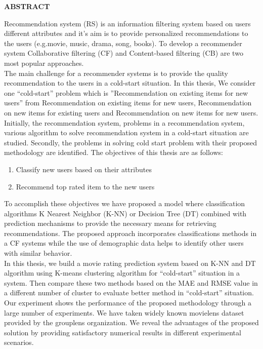 \documentclass[document.tex]{subfiles}
\begin{document}
\begin{center}
        \textbf{{\fontsize{16pt}{1.5cm}\selectfont ABSTRACT}}
        \vspace{1cm}
\end{center}

\noindent Recommendation system (RS) is an information filtering system based on users different attributes and it’s aim is to provide personalized recommendations to the users (e.g.movie, music, drama, song, books). To develop a recommender system Collaborative filtering (CF) and Content-based filtering (CB) are two most popular approaches.\\
The main challenge for a recommender systems is to provide the quality recommendation to the users in a cold-start situation. In this thesis, We consider one “cold-start” problem which is ”Recommendation on existing items for new users” from Recommendation on existing items for new users, Recommendation on new items for existing users and Recommendation on new items for new users. Initially, the recommendation system, problems in a recommendation system, various algorithm to solve recommendation system in a cold-start situation are studied. Secondly, the problems in solving cold start problem with their proposed methodology are identified.
The objectives of this thesis are as follows:
\begin{enumerate}
	\item Classify new users based on their attributes
	\item Recommend top rated item to the new users
\end{enumerate}	
To accomplish these objectives we have proposed a model where classification algorithms K Nearest Neighbor (K-NN) or Decision Tree (DT) combined with prediction mechanisms to provide the necessary means for retrieving recommendations. The proposed approach incorporates classifications methods in a CF systems while the use of demographic data helps to identify other users with similar behavior.\\
In this thesis, we build a movie rating prediction system based on K-NN and DT algorithm using K-means clustering algorithm for “cold-start” situation in a system. Then compare these two methods based on the MAE and RMSE value in a different number of cluster to evaluate better method in “cold-start” situation. Our experiment shows the performance of the proposed methodology through a large number of experiments. We have taken widely known movielens dataset provided by the grouplens organization. We reveal the advantages of the proposed solution by providing satisfactory numerical results in different experimental scenarios.

\clearpage
\end{document}
